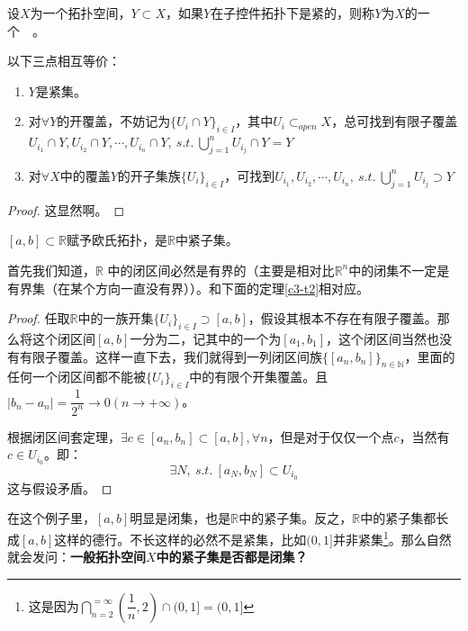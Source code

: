 \documentclass[lang=cn,10pt,device=pad]{elegantbook}
\newcommand{\cusong}{\CJKfamily{cusong}}%
\newcommand{\gn}[1]{~\textcolor{mygrn}{\cusong{#1}}~}
\newcommand{\st}{~s.t.~}
\newcommand{\dabing}{\displaystyle\bigcup}
\newcommand{\dajiao}{\displaystyle\bigcap}
\newcommand{\dkh}[1]{\{#1\}}
\begin{document}
\begin{definition}[紧子集]
	设$X$为一个拓扑空间，$Y\subset X$，如果$Y$在子控件拓扑下是紧的，则称$Y$为$X$的一个\gn{紧子集}。
\end{definition}
\begin{note}
以下三点相互等价：
\begin{enumerate}
	\item $Y$是紧集。
	\item 对$\forall Y$的开覆盖，不妨记为$\dkh{U_{i}\cap Y}_{i\in I}$，其中$U_{i}\subset_{open}X$，总可找到有限子覆盖$U_{i_{1}}\cap Y,U_{i_{2}}\cap Y,\cdots,U_{i_{n}}\cap Y, \st  \dabing_{j=1}^{n}U_{i_{j}}\cap Y = Y$
	\item 对$\forall X$中的覆盖$Y$的开子集族$\dkh{U_{i}}_{i\in I}$，可找到$U_{i_{1}},U_{i_{2}},\cdots,U_{i_{n}},\st \dabing_{j=1}^{n}U_{i_{j}}\supset Y$
\end{enumerate}	
\end{note}
\begin{proof}
	这显然啊。
\end{proof}
\begin{theorem}
	$[a,b]\subset \mathbb{R}$赋予欧氏拓扑，是$\mathbb{R}$中紧子集。
\end{theorem}

\begin{note}
首先我们知道，$\mathbb{R}$	中的闭区间必然是有界的（主要是相对比$\mathbb{R}^{n}$中的闭集不一定是有界集（在某个方向一直没有界））。和下面的定理\ref{c3-t2}相对应。
\end{note}

\begin{proof}
	任取$\mathbb{R}$中的一族开集$\dkh{U_{i}}_{i\in I}\supset [a,b]$，假设其根本不存在有限子覆盖。那么将这个闭区间$[a,b]$一分为二，记其中的一个为$[a_{1},b_{1}]$，这个闭区间当然也没有有限子覆盖。这样一直下去，我们就得到一列闭区间族$\dkh{[a_{n},b_{n}]}_{n\in \mathbb{N}}$，里面的任何一个闭区间都不能被$\dkh{U_{i}}_{i\in I}$中的有限个开集覆盖。且$|b_{n}-a_{n}| =\dfrac{1}{2^{n}} \to 0 (n\to +\infty)$。
	
	根据闭区间套定理，$\exists c\in [a_{n},b_{n}] \subset [a,b], \forall n$，但是对于仅仅一个点$c$，当然有$c\in U_{i_{0}}$。即：$$\exists N,\st [a_{N},b_{N}]\subset U_{i_{0}}$$这与假设矛盾。
\end{proof}

	在这个例子里，$[a,b]$明显是闭集，也是$\mathbb{R}$中的紧子集。反之，$\mathbb{R}$中的紧子集都长成$[a,b]$这样的德行。不长这样的必然不是紧集，比如$(0,1]$并非紧集\footnote{这是因为$\dajiao_{n=2}^{=\infty}(\dfrac{1}{n},2)\cap(0,1] = (0,1]$}。那么自然就会发问：\textbf{一般拓扑空间$X$中的紧子集是否都是闭集？}
\end{document}
